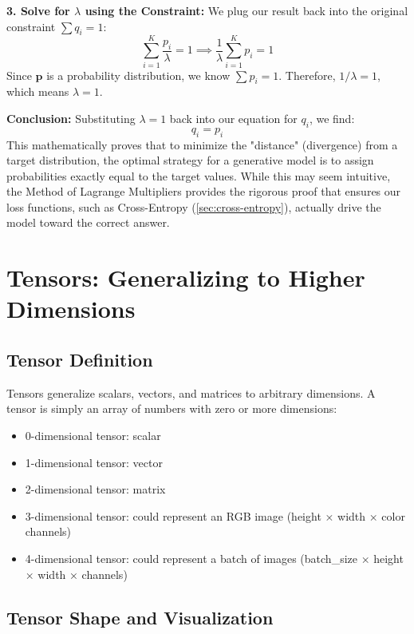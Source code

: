 \documentclass{book}
\begin{document}
\textbf{3. Solve for $\lambda$ using the Constraint:}
We plug our result back into the original constraint $\sum q_i = 1$:
\begin{equation}
\sum_{i=1}^{K} \frac{p_i}{\lambda} = 1 \implies \frac{1}{\lambda} \sum_{i=1}^{K} p_i = 1
\end{equation}
Since $\mathbf{p}$ is a probability distribution, we know $\sum p_i = 1$. Therefore, $1/\lambda = 1$, which means $\lambda = 1$.

\textbf{Conclusion:}
Substituting $\lambda = 1$ back into our equation for $q_i$, we find:
\begin{equation}
q_i = p_i
\end{equation}
This mathematically proves that to minimize the "distance" (divergence) from a target distribution, the optimal strategy for a generative model is to assign probabilities exactly equal to the target values. While this may seem intuitive, the Method of Lagrange Multipliers provides the rigorous proof that ensures our loss functions, such as Cross-Entropy (\ref{sec:cross-entropy}), actually drive the model toward the correct answer.

\section{Tensors: Generalizing to Higher Dimensions}

\subsection{Tensor Definition}

Tensors generalize scalars, vectors, and matrices to arbitrary dimensions. A tensor is simply an array of numbers with zero or more dimensions:

\begin{itemize}
\item 0-dimensional tensor: scalar
\item 1-dimensional tensor: vector
\item 2-dimensional tensor: matrix
\item 3-dimensional tensor: could represent an RGB image (height × width × color channels)
\item 4-dimensional tensor: could represent a batch of images (batch\_size × height × width × channels)
\end{itemize}

\subsection{Tensor Shape and Visualization}
\end{document}
